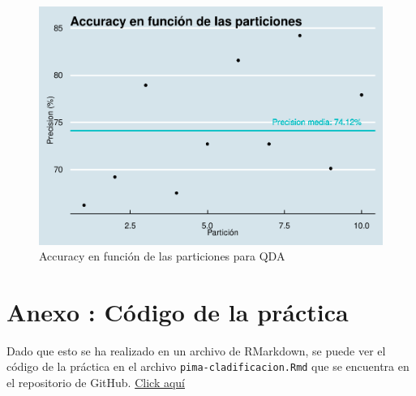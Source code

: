 \documentclass[
]{article}
\begin{document}
\begin{figure}

{\centering \includegraphics[width=0.5\linewidth]{pima-clasificacion_files/figure-latex/10f_qda-1} 

}

\caption{Accuracy en función de las particiones para QDA}\label{fig:10f_qda}
\end{figure}

\hypertarget{anexo-cuxf3digo-de-la-pruxe1ctica}{%
\section{Anexo : Código de la
práctica}\label{anexo-cuxf3digo-de-la-pruxe1ctica}}

Dado que esto se ha realizado en un archivo de RMarkdown, se puede ver
el código de la práctica en el archivo \texttt{pima-cladificacion.Rmd}
que se encuentra en el repositorio de GitHub.
\href{https://github.com/DanelArias-Dreyton257/DATCOM-Intro/blob/main/pima-clasificacion.Rmd}{Click
aquí}
\end{document}

